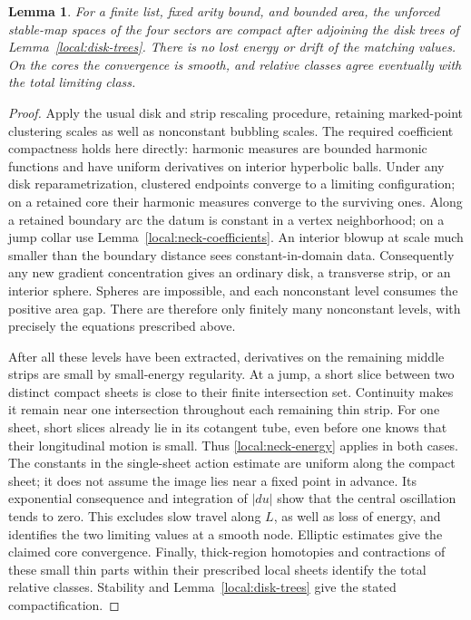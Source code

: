 \documentclass[11pt]{article}
\newtheorem{lemma}[theorem]{Lemma}
\theoremstyle{definition}
\theoremstyle{remark}
\numberwithin{equation}{section}
\begin{document}
\begin{lemma}\label{local:compactness}
For a finite list, fixed arity bound, and bounded area, the unforced
stable-map spaces of the four sectors are compact after adjoining the
disk trees of Lemma~\ref{local:disk-trees}.  There is no lost energy or
drift of the matching values.  On the cores the convergence is smooth,
and relative classes agree eventually with the total limiting class.
\end{lemma}
\begin{proof}
Apply the usual disk and strip rescaling procedure, retaining marked-point clustering scales as well as nonconstant bubbling scales.  The
required coefficient compactness holds here directly: harmonic
measures are bounded harmonic functions and have uniform derivatives
on interior hyperbolic balls.  Under any disk reparametrization,
clustered endpoints converge to a limiting configuration; on a
retained core their harmonic measures converge to the surviving ones.
Along a retained boundary arc the datum is constant in a vertex
neighborhood; on a jump collar use
Lemma~\ref{local:neck-coefficients}.  An interior blowup at scale much
smaller than the boundary distance sees constant-in-domain data.
Consequently any new gradient concentration gives an ordinary disk,
a transverse strip, or an interior sphere.  Spheres are impossible,
and each nonconstant level consumes the positive area gap.  There
are therefore only finitely many nonconstant levels, with precisely
the equations prescribed above.

After all these levels have been extracted, derivatives on the
remaining middle strips are small by small-energy regularity.  At
a jump, a short slice between two distinct compact sheets is close
to their finite intersection set.  Continuity makes it remain near
one intersection throughout each remaining thin strip.  For one
sheet, short slices already lie in its cotangent tube, even before
one knows that their longitudinal motion is small.  Thus
\eqref{local:neck-energy} applies in both cases.  The constants in the
single-sheet action estimate are uniform along the compact sheet;
it does not assume the image lies near a fixed point in advance.
Its exponential consequence and integration of $|du|$ show that the
central oscillation tends to zero.  This excludes slow travel along
$L$, as well as loss of energy, and identifies the two limiting values
at a smooth node.  Elliptic estimates give the claimed core
convergence.  Finally, thick-region homotopies and contractions of
these small thin parts within their prescribed local sheets identify
the total relative classes.  Stability and
Lemma~\ref{local:disk-trees} give the stated compactification.
\end{proof}
\end{document}
